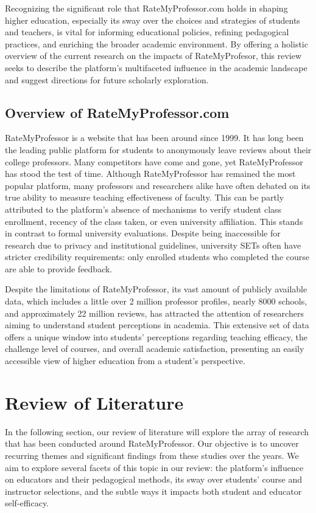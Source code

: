 \documentclass[man, 12pt]{apa7}
\begin{document}
Recognizing the significant role that RateMyProfessor.com holds in shaping higher education, especially its sway over the choices and strategies of students and teachers, is vital for informing educational policies, refining pedagogical practices, and enriching the broader academic environment. By offering a holistic overview of the current research on the impacts of RateMyProfesor, this review seeks to describe the platform's multifaceted influence in the academic landscape and suggest directions for future scholarly exploration.
\subsection{Overview of RateMyProfessor.com}
RateMyProfessor is a website that has been around since 1999. It has long been the leading public platform for students to anonymously leave reviews about their college professors. Many competitors have come and gone, yet RateMyProfessor has stood the test of time. Although RateMyProfessor has remained the most popular platform, many professors and researchers alike have often debated on its true ability to measure teaching effectiveness of faculty. This can be partly attributed to the platform's absence of mechanisms to verify student class enrollment, recency of the class taken, or even university affiliation. This stands in contrast to formal university evaluations. Despite being inaccessible for research due to privacy and institutional guidelines, university SETs often have stricter credibility requirements: only enrolled students who completed the course are able to provide feedback.

Despite the limitations of RateMyProfessor, its vast amount of publicly available data, which includes a little over 2 million professor profiles, nearly 8000 schools, and approximately 22 million reviews, has attracted the attention of researchers aiming to understand student perceptions in academia. This extensive set of data offers a unique window into students' perceptions regarding teaching efficacy, the challenge level of courses, and overall academic satisfaction, presenting an easily accessible view of higher education from a student's perspective.

\section{Review of Literature}
In the following section, our review of literature will explore the array of research that has been conducted around RateMyProfessor. Our objective is to uncover recurring themes and significant findings from these studies over the years. We aim to explore several facets of this topic in our review: the platform’s influence on educators and their pedagogical methods, its sway over students' course and instructor selections, and the subtle ways it impacts both student and educator self-efficacy.
\end{document}
